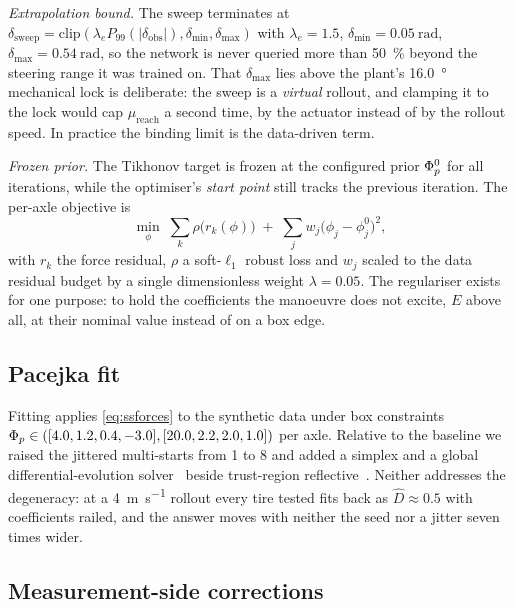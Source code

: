 \emph{Extrapolation bound.} The sweep terminates at
$\delta_{\mathrm{sweep}}=\mathrm{clip}(\lambda_{e}
P_{99}(|\delta_{\mathrm{obs}}|),\delta_{\min},\delta_{\max})$ with
$\lambda_{e}=1.5$, $\delta_{\min}=\SI{0.05}{\radian}$,
$\delta_{\max}=\SI{0.54}{\radian}$, so the network is never queried more than
\SI{50}{\percent} beyond the steering range it was trained on. That
$\delta_{\max}$ lies above the plant's \SI{16.0}{\degree} mechanical lock is
deliberate: the sweep is a \emph{virtual} rollout, and clamping it to the lock
would cap $\mu_{\mathrm{reach}}$ a second time, by the actuator instead of by
the rollout speed. In practice the binding limit is the data-driven term.

\emph{Frozen prior.} The Tikhonov target is frozen at the configured prior
$\Phi_{p}^{0}$ for all iterations, while the optimiser's \emph{start point} still
tracks the previous iteration. The per-axle objective is
\begin{equation}
\min_{\phi}\;\sum_{k}\rho\!\big(r_{k}(\phi)\big)\;+\;\sum_{j}w_{j}\big(\phi_{j}-\phi^{0}_{j}\big)^{2},
\label{eq:fitobj}
\end{equation}
with $r_{k}$ the force residual, $\rho$ a soft-$\ell_{1}$ robust loss and
$w_{j}$ scaled to the data residual budget by a single dimensionless weight
$\lambda=0.05$. The regulariser exists for one purpose: to hold the
coefficients the manoeuvre does not excite, $E$ above all, at their nominal
value instead of on a box edge.

\subsection{Pacejka fit}
\label{subsec:fit}

Fitting applies \eqref{eq:ssforces} to the synthetic data under box constraints
$\Phi_{p}\in([4.0,1.2,0.4,-3.0],[20.0,2.2,2.0,1.0])$ per axle. Relative to the
baseline we raised the jittered multi-starts from 1 to 8 and added a simplex
and a global differential-evolution solver~\cite{storn1997de} beside
trust-region reflective~\cite{branch1999trust}. Neither addresses the
degeneracy: at a \SI{4}{\meter\per\second} rollout every tire tested fits back
as $\hat D\approx\num{0.5}$ with coefficients railed, and the answer moves with
neither the seed nor a jitter seven times wider.

\subsection{Measurement-side corrections}
\label{subsec:measurement}

